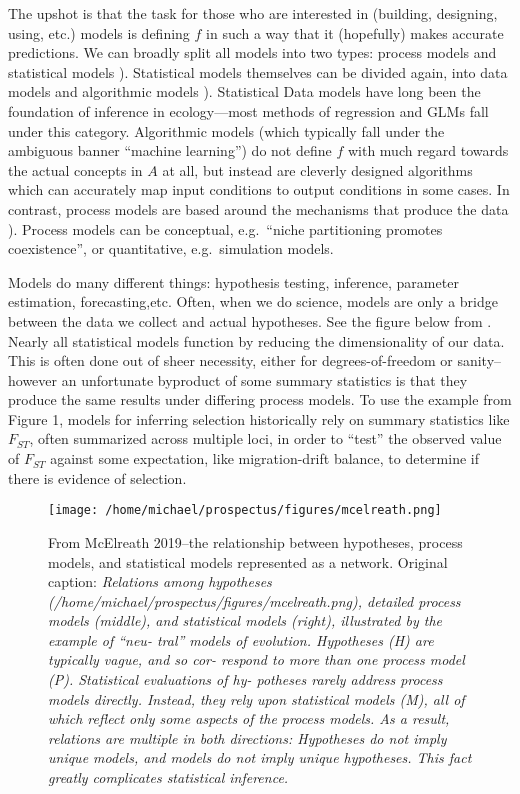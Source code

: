 \documentclass[]{article}
\begin{document}
The upshot is that the task for those who are interested in (building,
designing, using, etc.) models is defining \(f\) in such a way that it
(hopefully) makes accurate predictions. We can broadly split all models
into two types: process models and statistical models
\citep{mcelreath}). Statistical models themselves can be divided
again, into data models and algorithmic models \citep{breimann}).
Statistical Data models have long been the foundation of inference in
ecology---most methods of regression and GLMs fall under this category.
Algorithmic models (which typically fall under the ambiguous banner
``machine learning'') do not define \(f\) with much regard towards the
actual concepts in \(A\) at all, but instead are cleverly designed
algorithms which can accurately map input conditions to output
conditions in some cases. In contrast, process models are based around
the mechanisms that produce the data \citep{mcelreath}). Process
models can be conceptual, e.g.~``niche partitioning promotes
coexistence'', or quantitative, e.g.~simulation models.

Models do many different things: hypothesis testing, inference,
parameter estimation, forecasting,etc. Often, when we do science, models
are only a bridge between the data we collect and actual hypotheses. See
the figure below from \citep{mcelreath}. Nearly all statistical
models function by reducing the dimensionality of our data. This is
often done out of sheer necessity, either for degrees-of-freedom or
sanity--however an unfortunate byproduct of some summary statistics is
that they produce the same results under differing process models. To
use the example from Figure 1, models for inferring selection
historically rely on summary statistics like \(F_{ST}\), often
summarized across multiple loci, in order to ``test'' the observed value
of \(F_{ST}\) against some expectation, like migration-drift balance, to
determine if there is evidence of selection.

\begin{figure}[h]
\centering
\texttt{[image: /home/michael/prospectus/figures/mcelreath.png]}
\caption{From McElreath 2019--the relationship between hypotheses,
process models, and statistical models represented as a network.
Original caption: \emph{Relations among hypotheses
(/home/michael/prospectus/figures/mcelreath.png), detailed process
models (middle), and statistical models (right), illustrated by the
example of ``neu- tral'' models of evolution. Hypotheses (H) are
typically vague, and so cor- respond to more than one process model (P).
Statistical evaluations of hy- potheses rarely address process models
directly. Instead, they rely upon statistical models (M), all of which
reflect only some aspects of the process models. As a result, relations
are multiple in both directions: Hypotheses do not imply unique models,
and models do not imply unique hypotheses. This fact greatly complicates
statistical inference.}}
\end{figure}
\end{document}
